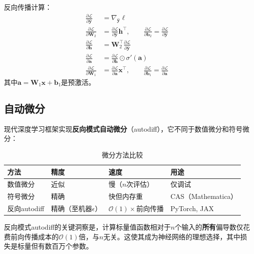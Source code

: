 反向传播计算：
\begin{align}
\frac{\partial \mathcal{L}}{\partial \hat{\mathbf{y}}} &= \nabla_{\hat{\mathbf{y}}} \ell \\
\frac{\partial \mathcal{L}}{\partial \mathbf{W}_2} &= \frac{\partial \mathcal{L}}{\partial \hat{\mathbf{y}}} \mathbf{h}^\top, \qquad \frac{\partial \mathcal{L}}{\partial \mathbf{b}_2} = \frac{\partial \mathcal{L}}{\partial \hat{\mathbf{y}}} \\
\frac{\partial \mathcal{L}}{\partial \mathbf{h}} &= \mathbf{W}_2^\top \frac{\partial \mathcal{L}}{\partial \hat{\mathbf{y}}} \\
\frac{\partial \mathcal{L}}{\partial \mathbf{a}} &= \frac{\partial \mathcal{L}}{\partial \mathbf{h}} \odot \sigma'(\mathbf{a}) \\
\frac{\partial \mathcal{L}}{\partial \mathbf{W}_1} &= \frac{\partial \mathcal{L}}{\partial \mathbf{a}} \mathbf{x}^\top, \qquad \frac{\partial \mathcal{L}}{\partial \mathbf{b}_1} = \frac{\partial \mathcal{L}}{\partial \mathbf{a}}
\end{align}
其中$\mathbf{a} = \mathbf{W}_1 \mathbf{x} + \mathbf{b}_1$是预激活。

\subsection{自动微分}

现代深度学习框架实现\textbf{反向模式自动微分}（autodiff），它不同于数值微分和符号微分：

\begin{table}[ht]
    \centering
    \caption{微分方法比较}
    \begin{tabular}{L{3cm} L{3.5cm} L{3.5cm} L{3cm}}
        \toprule
        \textbf{方法} & \textbf{精度} & \textbf{速度} & \textbf{用途} \\
        \midrule
        数值微分 & 近似 & 慢（$n$次评估） & 仅调试 \\
        符号微分 & 精确 & 快但内存重 & CAS（Mathematica） \\
        反向autodiff & 精确（至机器$\epsilon$） & $\mathcal{O}(1)\times$前向传播 & PyTorch, JAX \\
        \bottomrule
    \end{tabular}
\end{table}

反向模式autodiff的关键洞察是，计算标量值函数相对于$n$个输入的\textbf{所有}偏导数仅花费前向传播成本的$\mathcal{O}(1)$倍，与$n$无关。这使其成为神经网络的理想选择，其中损失是标量但有数百万个参数。

